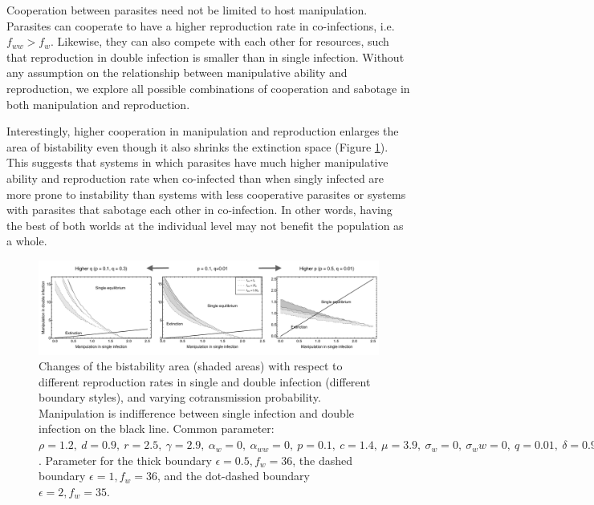 \documentclass[11pt]{article}
\begin{document}
Cooperation between parasites need not be limited to host manipulation. Parasites can cooperate to have a higher reproduction rate in co-infections, i.e. $f_{ww} > f_w$. Likewise, they can also compete with each other for resources, such that reproduction in double infection is smaller than in single infection. Without any assumption on the relationship between manipulative ability and reproduction, we explore all possible combinations of cooperation and sabotage in both manipulation and reproduction. 

Interestingly, higher cooperation in manipulation and reproduction enlarges the area of bistability even though it also shrinks the extinction space (Figure \ref{fig:manipbifur}). 
This suggests that systems in which parasites have much higher manipulative ability and reproduction rate when co-infected than when singly infected are more prone to instability than systems with less cooperative parasites or systems with parasites that sabotage each other in co-infection. 
In other words, having the best of both worlds at the individual level may not benefit the population as a whole.

\begin{figure}[!ht]
\centering
\includegraphics[width=\textwidth]{Figures/manip_bifurcation.pdf}
\caption{Changes of the bistability area (shaded areas) with respect to different reproduction rates in single and double infection (different boundary styles), and varying cotransmission probability. Manipulation is indifference between single infection and double infection on the black line. Common parameter:  $\rho = 1.2, \ d = 0.9, \ r = 2.5, \ \gamma = 2.9, \ \alpha_w = 0, \ \alpha_{ww} = 0, \ p = 0.1, \ c = 1.4, \ \mu = 3.9, \ \sigma_w = 0, \ \sigma_ww = 0, \ q = 0.01, \ \delta = 0.9, \ k = 0.26, \ \epsilon = 0.5$. Parameter for the thick boundary $\epsilon = 0.5, f_w = 36$, the dashed boundary $\epsilon = 1, f_w = 36$, and the dot-dashed boundary $\epsilon = 2, f_w = 35$.}
\label{fig:manipbifur}
\end{figure}
\end{document}
